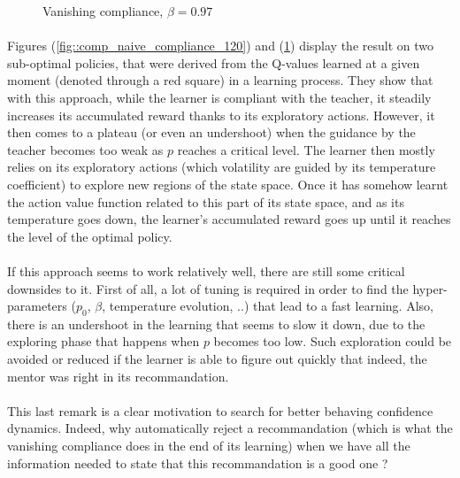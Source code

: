 \documentclass[a4paper]{report}
\begin{document}
{{{{\begin{figure}[ht!]
\begin{minipage}{0.5\linewidth}
\begin{center}
						\caption{Vanishing compliance, $\beta = 0.97$}
						\label{fig::comp_naive_compliance_50}
					\end{center}
				\end{minipage}
			\end{figure}
			
			\paragraph{} Figures (\ref{fig::comp_naive_compliance_120}) and (\ref{fig::comp_naive_compliance_50}) display the result on two sub-optimal policies, that were derived from the Q-values learned at a given moment (denoted through a red square) in a learning process. They show that with this approach, while the learner is compliant with the teacher, it steadily increases its accumulated reward thanks to its exploratory actions. However, it then comes to a plateau (or even an undershoot) when the guidance by the teacher becomes too weak as $p$ reaches a critical level. The learner then mostly relies on its exploratory actions (which volatility are guided by its temperature coefficient) to explore new regions of the state space. Once it has somehow learnt the action value function related to this part of its state space, and as its temperature goes down, the learner's accumulated reward goes up until it reaches the level of the optimal policy. 

		}		
		
		\paragraph{} If this approach seems to work relatively well, there are still some critical downsides to it. First of all, a lot of tuning is required in order to find the hyper-parameters ($p_0$, $\beta$, temperature evolution, ..) that lead to a fast learning. Also, there is an undershoot in the learning that seems to slow it down, due to the exploring phase that happens when $p$ becomes too low. Such exploration could be avoided or reduced if the learner is able to figure out quickly that indeed, the mentor was right in its recommandation.
		
		\paragraph{} This last remark is a clear motivation to search for better behaving confidence dynamics. Indeed, why automatically reject a recommandation (which is what the vanishing compliance does in the end of its learning) when we have all the information needed to state that this recommandation is a good one ?
	}
	
}}
\end{document}
